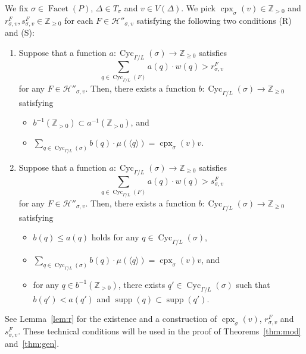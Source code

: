 \documentclass[11pt]{article}
\theoremstyle{definition}
\numberwithin{equation}{section}
\begin{document}
We fix $\sigma \in \operatorname{Facet}(P)$, $\Delta \in T_{\sigma}$ and $v \in V(\Delta)$. 
We pick $\operatorname{cpx}_{\sigma}(v) \in \mathbb{Z}_{> 0}$ and 
$r^{F} _{\sigma, v}, s^{F} _{\sigma, v} \in \mathbb{Z}_{\ge 0}$ for each $F \in \mathcal{H}'' _{\sigma, v}$ 
satisfying the following two conditions (R) and (S):
\begin{enumerate}
\item[(R)] 
Suppose that a function $a: \operatorname{Cyc}_{\Gamma /L}(\sigma) \to \mathbb{Z}_{\ge 0}$ satisfies 
\[
\sum _{q \in \operatorname{Cyc}_{\Gamma /L}(F)} a(q) \cdot w(q) > r^{F} _{\sigma, v}
\]
for any $F \in \mathcal{H}'' _{\sigma, v}$. 
Then, there exists a function $b: \operatorname{Cyc}_{\Gamma /L}(\sigma) \to \mathbb{Z}_{\ge 0}$ 
satisfying 
\begin{itemize}
\item 
$b^{-1}(\mathbb{Z}_{>0}) \subset a^{-1}(\mathbb{Z}_{>0})$, and

\item
$\sum _{q \in \operatorname{Cyc}_{\Gamma /L}(\sigma)} b(q) \cdot \mu(\langle q \rangle) = \operatorname{cpx}_{\sigma}(v) v$. 
\end{itemize}

\item[(S)] 
Suppose that a function $a: \operatorname{Cyc}_{\Gamma /L}(\sigma) \to \mathbb{Z}_{\ge 0}$ satisfies 
\[
\sum _{q \in \operatorname{Cyc}_{\Gamma /L}(F)} a(q) \cdot w(q) > s^{F} _{\sigma, v}
\]
for any $F \in \mathcal{H}'' _{\sigma, v}$. 
Then, there exists a function $b: \operatorname{Cyc}_{\Gamma /L}(\sigma) \to \mathbb{Z}_{\ge 0}$ 
satisfying 
\begin{itemize}
\item 
$b(q) \le a(q)$ holds for any $q \in \operatorname{Cyc}_{\Gamma /L}(\sigma)$, 

\item 
$\sum _{q \in \operatorname{Cyc}_{\Gamma /L}(\sigma)} b(q) \cdot \mu(\langle q \rangle) = \operatorname{cpx}_{\sigma}(v) v$, and 

\item
for any $q \in b^{-1}(\mathbb{Z}_{>0})$, 
there exists $q' \in \operatorname{Cyc}_{\Gamma /L}(\sigma)$ 
such that $b(q') < a(q')$ and $\operatorname{supp}(q) \subset \operatorname{supp}(q')$.
\end{itemize}
\end{enumerate}

\noindent
See Lemma~\ref{lem:r} for the existence and a construction of $\operatorname{cpx}_{\sigma}(v)$, 
$r^{F} _{\sigma, v}$ and $s^{F} _{\sigma, v}$. 
These technical conditions will be used in the proof of Theorems~\ref{thm:mod} and~\ref{thm:gen}. 
\end{document}
